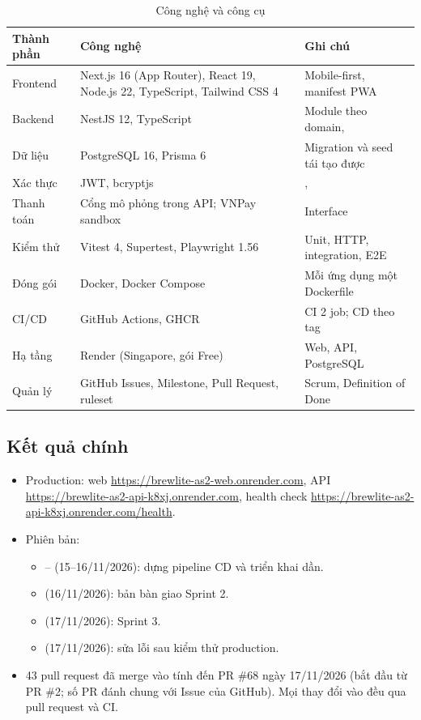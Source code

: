 \begin{table}[H]
\centering
\caption{Công nghệ và công cụ}\label{tab:congnghe}
\begin{tabular}{@{}L{3.4cm}L{5.2cm}L{5.2cm}@{}}
\toprule
\textbf{Thành phần} & \textbf{Công nghệ} & \textbf{Ghi chú} \\ \midrule
Frontend & Next.js 16 (App Router), React 19, Node.js 22, TypeScript, Tailwind CSS 4 & Mobile-first, manifest PWA \\
Backend & NestJS 12, TypeScript & Module theo domain,  \\
Dữ liệu & PostgreSQL 16, Prisma 6 & Migration và seed tái tạo được \\
Xác thực & JWT, bcryptjs & ,  \\
Thanh toán & Cổng mô phỏng trong API; VNPay sandbox & Interface  \\
Kiểm thử & Vitest 4, Supertest, Playwright 1.56 & Unit, HTTP, integration, E2E \\
Đóng gói & Docker, Docker Compose & Mỗi ứng dụng một Dockerfile \\
CI/CD & GitHub Actions, GHCR & CI 2 job; CD theo tag  \\
Hạ tầng & Render (Singapore, gói Free) & Web, API, PostgreSQL \\
Quản lý & GitHub Issues, Milestone, Pull Request, ruleset & Scrum, Definition of Done \\
\bottomrule
\end{tabular}
\end{table}

\subsection{Kết quả chính}
\begin{itemize}
\item Production: web \url{https://brewlite-as2-web.onrender.com}, API \url{https://brewlite-as2-api-k8xj.onrender.com}, health check \url{https://brewlite-as2-api-k8xj.onrender.com/health}.
\item Phiên bản:
  \begin{itemize}
  \item {}-- (15--16/11/2026): dựng pipeline CD và triển khai dần.
  \item {} (16/11/2026): bản bàn giao Sprint 2.
  \item {} (17/11/2026): Sprint 3.
  \item {} (17/11/2026): sửa lỗi sau kiểm thử production.
  \end{itemize}
\item 43 pull request đã merge vào  tính đến PR \#68 ngày 17/11/2026 (bắt đầu từ PR \#2; số PR đánh chung với Issue của GitHub). Mọi thay đổi vào  đều qua pull request và CI.
\end{itemize}

